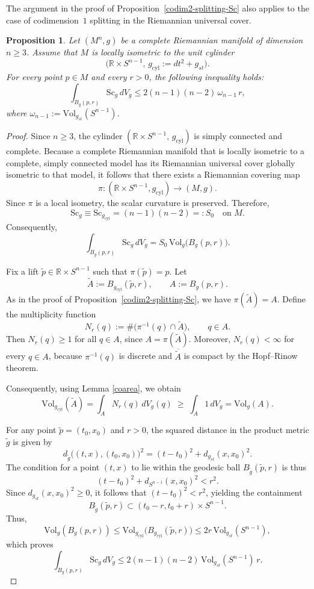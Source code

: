 \documentclass[12pt,oneside,a4paper]{article}
\newtheorem{proposition}[definition]{Proposition}
\theoremstyle{mytheorem}
\theoremstyle{remark}
\begin{document}
The argument in the proof of Proposition~\ref{codim2-splitting-Sc} also applies to the case of codimension~$1$ splitting in the Riemannian universal cover.


\begin{proposition}\label{cyl_scalar_integral}
Let $(M^n,g)$ be a complete Riemannian manifold of dimension $n \ge 3$.
Assume that $M$ is locally isometric to the unit cylinder
\[
\bigl(\mathbb{R} \times S^{n-1},\, g_{\mathrm{cyl}} := dt^2 + g_{st}\bigr).
\]
 For every point $p \in M$ and every $r>0$, the following inequality holds:
\[ 
\int_{B_g(p,r)} \mathrm{Sc}_g \, dV_g \leq
2(n-1)(n-2)\,\omega_{n-1}\, r,
\]
where $\omega_{n-1}:=\mathrm{Vol}_{g_{st}}(S^{n-1})$. 
\end{proposition}


\begin{proof}
Since $n \ge 3$, the cylinder
$(\mathbb{R} \times S^{n-1},\, g_{\mathrm{cyl}})$ is simply connected and complete.
Because a complete Riemannian manifold that is locally isometric to a complete,
simply connected model has its Riemannian universal cover globally isometric to
that model, it follows that there exists a Riemannian covering map
\[
\pi : (\mathbb{R} \times S^{n-1}, g_{\mathrm{cyl}})
\longrightarrow (M,g).
\]
Since $\pi$ is a local isometry, the scalar curvature is preserved.
Therefore,
\[
\mathrm{Sc}_g \equiv \mathrm{Sc}_{g_{\mathrm{cyl}}}
= (n-1)(n-2)
=: S_0
\quad \text{on } M.
\]
Consequently,
\[
\int_{B_g(p,r)} \mathrm{Sc}_g \, dV_g
= S_0 \, \mathrm{Vol}_g\bigl(B_g(p,r)\bigr).
\]



Fix a lift $\tilde p \in \mathbb{R} \times S^{n-1}$ such that $\pi(\tilde p)=p$.
Let
\[
\widetilde A := B_{g_{\mathrm{cyl}}}(\tilde p,r),
\qquad
A := B_g(p,r).
\]
As in the proof of Proposition~\ref{codim2-splitting-Sc}, we have
$\pi(\widetilde A)=A.$ Define the multiplicity function
\[
N_r(q)
:= \#\bigl(\pi^{-1}(q)\cap \widetilde A\bigr),
\qquad q\in A.
\]
Then $N_r(q)\ge 1$ for all $q\in A$, since $A=\pi(\widetilde A)$.
Moreover, $N_r(q)<\infty$ for every $q\in A$, because $\pi^{-1}(q)$ is discrete
and $\overline{\widetilde A}$ is compact by the Hopf--Rinow theorem.

Consequently, using Lemma \ref{coarea}, we obtain
\[
\mathrm{Vol}_{g_{\mathrm{cyl}}}(\widetilde A)
=
\int_A N_r(q)\, dV_g(q)
\;\ge\;
\int_A 1\, dV_g
=
\mathrm{Vol}_g(A).
\]

For any point $\tilde{p} = (t_0, x_0)$ and $r > 0$, the squared distance in the product metric $\tilde{g}$ is given by $$d_{\tilde{g}}\bigl((t, x), (t_0, x_0)\bigr)^2 = (t - t_0)^2 + d_{g_{st}}(x, x_0)^2.$$The condition for a point $(t, x)$ to lie within the geodesic ball $B_{\tilde{g}}(\tilde{p}, r)$ is thus$$(t - t_0)^2 + d_{S^{n-1}}(x, x_0)^2 < r^2.$$Since $d_{g_{st}}(x, x_0)^2 \geq 0$, it follows that $(t - t_0)^2 < r^2$, yielding the containment$$B_{\tilde{g}}(\tilde{p}, r) \subset (t_0 - r, t_0 + r) \times S^{n-1}.$$
Thus,
\[
\mathrm{Vol}_g(B_g(p,r)) \leq \mathrm{Vol}_{g_{\mathrm{cyl}}}\bigl(B_{g_{\mathrm{cyl}}}(\tilde p,r)\bigr)
\le 2r\,\mathrm{Vol}_{g_{st}}(S^{n-1}),
\]
which proves \[ 
\int_{B_g(p,r)} \mathrm{Sc}_g \, dV_g \leq
2(n-1)(n-2)\,\mathrm{Vol}_{g_{st}}(S^{n-1})\, r.
\]
\end{proof}
\end{document}
